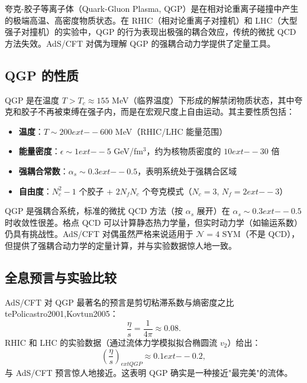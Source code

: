 \begin{note}[物理动机]
夸克-胶子等离子体（Quark-Gluon Plasma, QGP）是在相对论重离子碰撞中产生的极端高温、高密度物质状态。在 RHIC（相对论重离子对撞机）和 LHC（大型强子对撞机）的实验中，QGP 的行为表现出极强的耦合效应，传统的微扰 QCD 方法失效。AdS/CFT 对偶为理解 QGP 的强耦合动力学提供了定量工具。
\end{note}

\subsection{QGP 的性质}

\begin{definition}[夸克-胶子等离子体]\label{def:QGP}
QGP 是在温度 $T > T_c \approx 155$ MeV（临界温度）下形成的解禁闭物质状态，其中夸克和胶子不再被束缚在强子内，而是在宏观尺度上自由运动。其主要性质包括：
\begin{itemize}
    \item \textbf{温度}：$T \sim 200ext{--}600$ MeV（RHIC/LHC 能量范围）
    \item \textbf{能量密度}：$\epsilon \sim 1ext{--}5$ GeV/fm$^3$，约为核物质密度的 $10ext{--}30$ 倍
    \item \textbf{强耦合常数}：$\alpha_s \sim 0.3ext{--}0.5$，表明系统处于强耦合区域
    \item \textbf{自由度}：$N_c^2 - 1$ 个胶子 + $2N_f N_c$ 个夸克模式（$N_c = 3$, $N_f = 2ext{--}3$）
\end{itemize}
\end{definition}

\begin{remark}
QGP 是强耦合系统，标准的微扰 QCD 方法（按 $\alpha_s$ 展开）在 $\alpha_s \sim 0.3ext{--}0.5$ 时收敛性很差。格点 QCD 可以计算静态热力学量，但实时动力学（如输运系数）仍具有挑战性。AdS/CFT 对偶虽然严格来说适用于 $\mathcal{N}=4$ SYM（不是 QCD），但提供了强耦合动力学的定量计算，并与实验数据惊人地一致。
\end{remark}

\subsection{全息预言与实验比较}

\begin{example}[剪切粘滞系数的全息预言]\label{ex:eta-s-QGP}
AdS/CFT 对 QGP 最著名的预言是剪切粘滞系数与熵密度之比 te{Policastro2001,Kovtun2005}：
\begin{equation}
    \frac{\eta}{s} = \frac{1}{4\pi} \approx 0.08.
\end{equation}
RHIC 和 LHC 的实验数据（通过流体力学模拟拟合椭圆流 $v_2$）给出：
\begin{equation}
    \left(\frac{\eta}{s}\right)_{ext{QGP}} \approx 0.1ext{--}0.2,
\end{equation}
与 AdS/CFT 预言惊人地接近。这表明 QGP 确实是一种接近"最完美"的流体。
\end{example}

